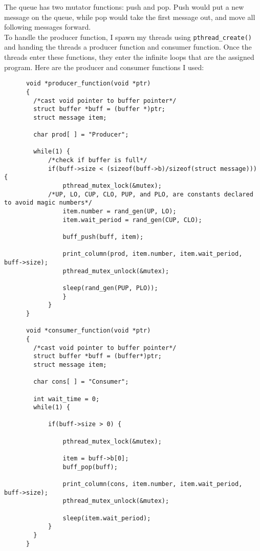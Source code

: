 \documentclass[10pt,letterpaper]{article}
\begin{document}
    \noindent The queue has two mutator functions: push and pop. Push would put
    a new message on the queue, while pop would take the first message out, and
    move all following messages forward.\\

    \noindent To handle the producer function, I spawn my threads using
    \texttt{pthread\_create()} and handing the threads a producer function and consumer
    function. Once the threads enter these functions, they enter the infinite
    loops that are the assigned program. Here are the producer and consumer
    functions I used:

    \begin{lstlisting}
      void *producer_function(void *ptr)
      {
      	/*cast void pointer to buffer pointer*/
      	struct buffer *buff = (buffer *)ptr;
      	struct message item;

      	char prod[ ] = "Producer";

      	while(1) {
      		/*check if buffer is full*/
      		if(buff->size < (sizeof(buff->b)/sizeof(struct message))) {
      			pthread_mutex_lock(&mutex);
            /*UP, LO, CUP, CLO, PUP, and PLO, are constants declared to avoid magic numbers*/
      			item.number = rand_gen(UP, LO);
      			item.wait_period = rand_gen(CUP, CLO);

      			buff_push(buff, item);

      			print_column(prod, item.number, item.wait_period, buff->size);
      			pthread_mutex_unlock(&mutex);

      			sleep(rand_gen(PUP, PLO));
      			}
      		}
      }

      void *consumer_function(void *ptr)
      {
      	/*cast void pointer to buffer pointer*/
      	struct buffer *buff = (buffer*)ptr;
      	struct message item;

      	char cons[ ] = "Consumer";

      	int wait_time = 0;
      	while(1) {

      		if(buff->size > 0) {

      			pthread_mutex_lock(&mutex);

      			item = buff->b[0];
      			buff_pop(buff);

      			print_column(cons, item.number, item.wait_period, buff->size);
      			pthread_mutex_unlock(&mutex);

      			sleep(item.wait_period);
      		}
      	}
      }
    \end{lstlisting}
\end{document}
